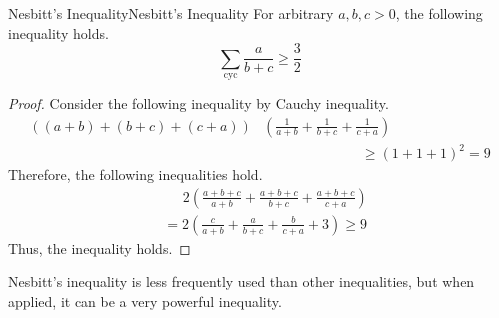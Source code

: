\documentclass[../../../main.tex]{subfiles}
\begin{document}
\begin{theorem}{Nesbitt's Inequality}{Nesbitt's Inequality}
For arbitrary $a, b, c > 0$, the following inequality holds.
\[
\sum_\text{cyc} \frac{a}{b + c} \geq \frac{3}{2}
\]
\end{theorem}
\begin{proof}
Consider the following inequality by Cauchy inequality.
\begin{align*}
    \left( (a + b) + (b + c) + (c + a) \right) &\left(
        \frac{1}{a + b} + \frac{1}{b + c} + \frac{1}{c + a}
    \right) \\
    &\qquad\qquad\qquad\quad
    \geq (1 + 1 + 1)^2
    = 9
\end{align*}
Therefore, the following inequalities hold.
\begin{align*}
    &\quad\,\ 2 \left(
        \frac{a + b + c}{a + b} + \frac{a + b + c}{b + c}
            + \frac{a + b + c}{c + a}
    \right) \\
    &= 2 \left(
        \frac{c}{a + b} + \frac{a}{b + c} + \frac{b}{c + a} + 3
    \right)
    \geq 9
\end{align*}
Thus, the inequality holds.
\end{proof}

Nesbitt's inequality is less frequently used than other inequalities,
but when applied, it can be a very powerful inequality.
\end{document}
